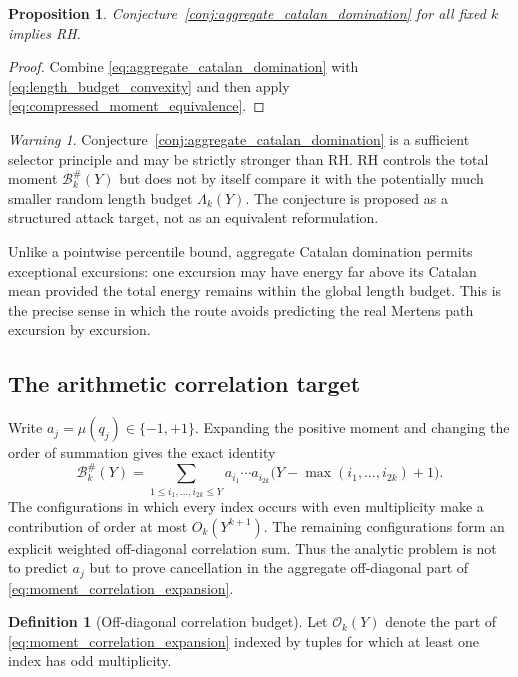 \documentclass[11pt]{amsart}
\numberwithin{equation}{section}
\theoremstyle{plain}
\newtheorem{proposition}[theorem]{Proposition}
\theoremstyle{definition}
\newtheorem{definition}[theorem]{Definition}
\theoremstyle{remark}
\newtheorem{warning}[theorem]{Warning}
\newcommand{\Mob}{\mu}
\begin{document}
\begin{proposition}
\label{prop:aggregate_catalan_domination_implies_rh}
Conjecture~\ref{conj:aggregate_catalan_domination} for all fixed $k$ implies
RH.
\end{proposition}

\begin{proof}
Combine \eqref{eq:aggregate_catalan_domination} with
\eqref{eq:length_budget_convexity} and then apply
\eqref{eq:compressed_moment_equivalence}.
\end{proof}

\begin{warning}
\label{warn:aggregate_domination_strength}
Conjecture~\ref{conj:aggregate_catalan_domination} is a sufficient selector
principle and may be strictly stronger than RH.  RH controls the total moment
$\mathcal B_k^{\#}(Y)$ but does not by itself compare it with the potentially
much smaller random length budget $\Lambda_k(Y)$.  The conjecture is proposed
as a structured attack target, not as an equivalent reformulation.
\end{warning}

Unlike a pointwise percentile bound, aggregate Catalan domination permits
exceptional excursions: one excursion may have energy far above its Catalan
mean provided the total energy remains within the global length budget.  This
is the precise sense in which the route avoids predicting the real Mertens
path excursion by excursion.

\subsection{The arithmetic correlation target}

Write $a_j=\Mob(q_j)\in\{-1,+1\}$.  Expanding the positive moment and changing
the order of summation gives the exact identity
\begin{equation}
\mathcal B_k^{\#}(Y)
=
\sum_{1\leq i_1,\ldots,i_{2k}\leq Y}
a_{i_1}\cdots a_{i_{2k}}
\bigl(Y-\max(i_1,\ldots,i_{2k})+1\bigr).
\label{eq:moment_correlation_expansion}
\end{equation}
The configurations in which every index occurs with even multiplicity make a
contribution of order at most $O_k(Y^{k+1})$.  The remaining configurations
form an explicit weighted off-diagonal correlation sum.  Thus the analytic
problem is not to predict $a_j$ but to prove cancellation in the aggregate
off-diagonal part of \eqref{eq:moment_correlation_expansion}.

\begin{definition}[Off-diagonal correlation budget]
\label{def:off_diagonal_budget}
Let $\mathcal O_k(Y)$ denote the part of
\eqref{eq:moment_correlation_expansion} indexed by tuples for which at least
one index has odd multiplicity.
\end{definition}
\end{document}
